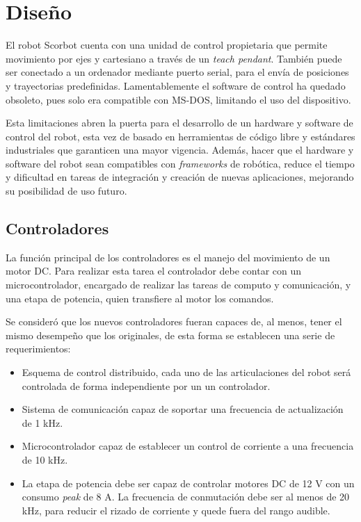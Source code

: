 \chapter{Diseño}

El robot Scorbot cuenta con una unidad de control propietaria que permite movimiento por ejes y cartesiano a través de un \textit{teach pendant}. También puede ser conectado a un ordenador mediante puerto serial, para el envía de posiciones y trayectorias predefinidas. Lamentablemente el software de control ha quedado obsoleto, pues solo era compatible con MS-DOS, limitando el uso del dispositivo.

Esta limitaciones abren la puerta para el desarrollo de un hardware y software de control del robot, esta vez de basado en herramientas de código libre y estándares industriales que garanticen una mayor vigencia. Además, hacer que el hardware y software del robot sean compatibles con \textit{frameworks} de robótica, reduce el tiempo y dificultad en tareas de integración y creación de nuevas aplicaciones, mejorando su posibilidad de uso futuro.

\section{Controladores} \label{cap3_controladores}

La función principal de los controladores es el manejo del movimiento de un motor DC. Para realizar esta tarea el controlador debe contar con un microcontrolador, encargado de realizar las tareas de computo y comunicación, y una etapa de potencia, quien transfiere al motor los comandos.

Se consideró que los nuevos controladores fueran capaces de, al menos, tener el mismo desempeño que los originales, de esta forma se establecen una serie de requerimientos:

\begin{itemize}
\item Esquema de control distribuido, cada uno de las articulaciones del robot será controlada de forma independiente por un un controlador.
\item Sistema de comunicación capaz de soportar una frecuencia de actualización de 1 \si{\kilo\hertz}.
\item Microcontrolador capaz de establecer un control de corriente a una frecuencia de 10 \si{\kilo\hertz}.
\item La etapa de potencia debe ser capaz de controlar motores DC de 12 \si{\volt} con un consumo \textit{peak} de 8 \si{\ampere}. La frecuencia de conmutación debe ser al menos de 20 \si{\kilo\hertz}, para reducir el rizado de corriente y quede fuera del rango audible. 
\end{itemize}

